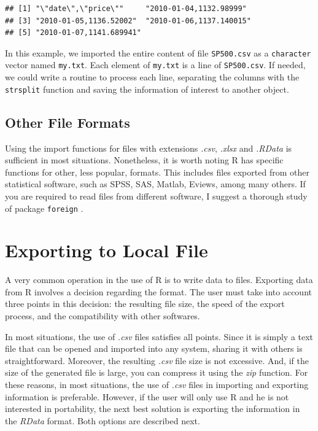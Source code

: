 \documentclass[11pt,]{book}
\begin{document}
\begin{verbatim}
## [1] "\"date\",\"price\""     "2010-01-04,1132.98999" 
## [3] "2010-01-05,1136.52002"  "2010-01-06,1137.140015"
## [5] "2010-01-07,1141.689941"
\end{verbatim}

In this example, we imported the entire content of file
\texttt{SP500.csv} as a \texttt{character} vector named \texttt{my.txt}.
Each element of \texttt{my.txt} is a line of \texttt{SP500.csv}. If
needed, we could write a routine to process each line, separating the
columns with the \texttt{strsplit} function and saving the information
of interest to another object. 

\subsection{Other File Formats}\label{other-file-formats}

Using the import functions for files with extensions \emph{.csv},
\emph{.xlsx} and \emph{.RData} is sufficient in most situations.
Nonetheless, it is worth noting R has specific functions for other, less
popular, formats. This includes files exported from other statistical
software, such as SPSS, SAS, Matlab, Eviews, among many others. If you
are required to read files from different software, I suggest a thorough
study of package \texttt{foreign} \citep{RCoreTeam2015foreign}.

\section{Exporting to Local File}\label{exporting-to-local-file}

A very common operation in the use of R is to write data to files.
Exporting data from R involves a decision regarding the format. The user
must take into account three points in this decision: the resulting file
size, the speed of the export process, and the compatibility with other
softwares.

In most situations, the use of \emph{.csv} files satisfies all points.
Since it is simply a text file that can be opened and imported into any
system, sharing it with others is straightforward. Moreover, the
resulting \emph{.csv} file size is not excessive. And, if the size of
the generated file is large, you can compress it using the \emph{zip}
function. For these reasons, in most situations, the use of \emph{.csv}
files in importing and exporting information is preferable. However, if
the user will only use R and he is not interested in portability, the
next best solution is exporting the information in the \emph{RData}
format. Both options are described next.
\end{document}
